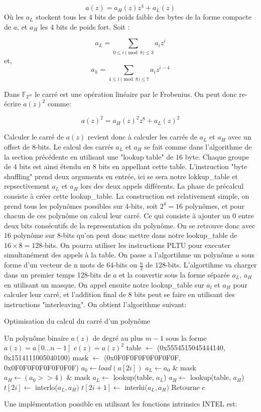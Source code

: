 \documentclass[12pt]{article}
\begin{document}
$$ a(z) = a_H(z)z^4 + a_L(z) $$
Où les $a_L$ stockent tous les $4$ bits de poids faible des bytes de la forme compacte de $a$, et $a_H$ les $4$ bits de poids fort. Soit :

$$ a_L = \sum_{0 \leq i\pmod 8 \leq 3} a_iz^i $$
et,
$$ a_h = \sum_{4 \leq i\pmod 8 \leq 7} a_iz^{i-4} $$

Dans $\mathbb{F}_{2^m}$ le carré est une opération linéaire par le Frobenius. On peut donc re-écrire $a(z)^2$ comme:

$$ a(z)^2 = a_H(z)^2z^8 + a_L(z)^2  $$

Calculer le carré de $a(z)$ revient donc à calculer les carrés de $a_L$ et $a_H$ avec un offset de $8$-bits. Le calcul des carrés $a_L$ et $a_H$ se fait comme dans l'algorithme de la section précédente en utilisant une "lookup table" de $16$ byte. Chaque groupe de $4$ bits est ainsi étendu en $8$ bits en appellant cette table. L'instruction "byte shuffling" prend deux arguments en entrée, ici se sera notre lokkup\_table et repsectivement $a_L$ et $a_H$ lors des deux appels différents. La phase de précalcul consiste à créer cette lookup\_table. La construction est relativement simple, on prend tous les polynômes possibles sur $4$-bits, soit $2^4=16$ polynômes, et pour chacun de ces polynôme on calcul leur carré. Ce qui consiste à ajouter un $0$ entre deux bits consécutifs de la representation du polynôme. On se retrouve donc avec $16$ polynôme sur $8$-bits qu'on peut donc mettre dans notre lookup\_table de $16\times8 = 128$-bits.  On pourra utiliser les instructions PLTU pour executer simultanément des appels à la table. \newline
On passe a l'algortihme un polynôme $a$ sous forme d'un vecteur de n mots de $64$-bits ou $\frac{n}{2}$ de $128$-bits. L'algortihme va charger dans un premier temps 128-bits de $a$ et la convertir sous la forme séparée $a_L$, $a_H$ en utilisant un masque. On appel ensuite notre lookup\_table sur $a_l$ et $a_H$ pour calculer leur carré, et l'addition final de $8$ bits peut se faire en utilisant des instructions "interleaving". On obtient l'algorithme suivant:

\begin{algorithm}
\caption{Optimisation du calcul du carré d'un polynôme}
\begin{algorithmic}
\REQUIRE Un polynôme binaire $a(z)$ de degré au plus $m-1$ sous la forme $a(z)=a[0\ldots n-1]$
\ENSURE $c(z) = a(z)^2$
\STATE table $\leftarrow$ (0x5554515045444140, 0x1514111005040100)
\STATE mask $\leftarrow$ (0x0F0F0F0F0F0F0F0F, 0x0F0F0F0F0F0F0F0F)
\STATE $a_0 \leftarrow load(a[2i])$
\STATE $a_L \leftarrow a_0$ \& mask
\STATE  $a_H \leftarrow (a_0 >> 4)$ \& mask
\STATE  $a_L \leftarrow $ lookup(table, $a_L$)
\STATE  $a_H \leftarrow $ lookup(table, $a_H$)
\STATE $t[2i] \leftarrow $ interlo($a_L, a_H)$
\STATE $t[2i+1] \leftarrow $ interhi($a_L, a_H)$
\ENDFOR
\STATE Retourne $c$
\end{algorithmic}
\end{algorithm}
Une implémentation possible en utilisant les fonctions intrinsics INTEL est:
\end{document}
